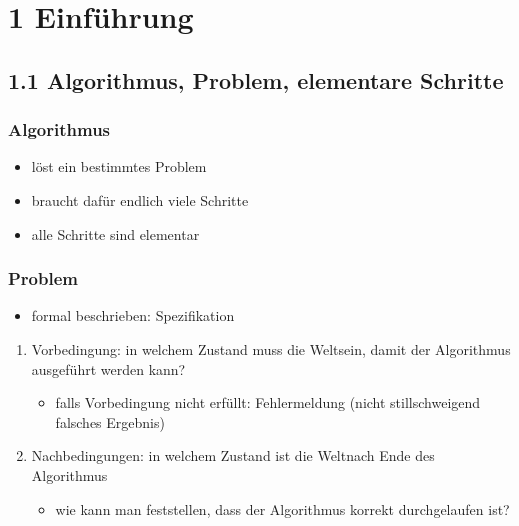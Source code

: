 \chapter*{1 Einführung}

\section*{1.1 Algorithmus, Problem, elementare Schritte}

\subsection*{Algorithmus}
    \begin{itemize}[label={-}]
        \item löst ein bestimmtes Problem
        \item braucht dafür endlich viele Schritte
        \item alle Schritte sind elementar
    \end{itemize}


\subsection*{Problem}
    \begin{itemize}[label={-}]
        \item formal beschrieben: Spezifikation
    \end{itemize}

    \medskip


    \begin{enumerate}
        \item Vorbedingung: in welchem Zustand muss die \glqq Welt\grqq sein, damit der Algorithmus ausgeführt werden kann?
        \begin{itemize}[label={$\rightarrow$}]
            \item falls Vorbedingung nicht erfüllt: Fehlermeldung (nicht stillschweigend falsches Ergebnis)
        \end{itemize}
        \item Nachbedingungen: in welchem Zustand ist die \glqq Welt\grqq nach Ende des Algorithmus
        \begin{itemize}[label={$\rightarrow$}]
            \item wie kann man feststellen, dass der Algorithmus korrekt durchgelaufen ist?
        \end{itemize}
    \end{enumerate}

